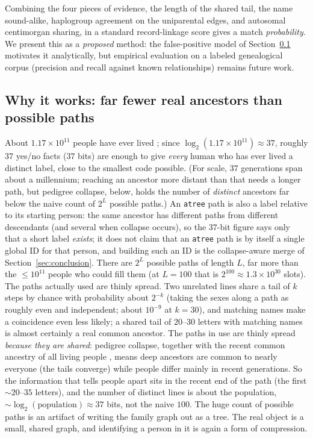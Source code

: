 \documentclass[11pt]{article}
\newcommand{\atree}{\texttt{atree}}
\begin{document}
Combining
the four pieces of evidence, the length of the shared tail, the name sound-alike, haplogroup
agreement on the uniparental edges, and autosomal centimorgan sharing, in a standard record-linkage
score \cite{fellegi1969} gives a match \emph{probability}. We present this as a
\emph{proposed} method: the false-positive model of Section~\ref{sec:why} motivates it analytically,
but empirical evaluation on a labeled genealogical corpus (precision and recall against known
relationships) remains future work.

\subsection{Why it works: far fewer real ancestors than possible paths}
\label{sec:why}
About $1.17\times10^{11}$ people have ever lived \cite{prb_everlived}; since
$\log_2(1.17\times10^{11})\approx 37$, roughly $37$ yes/no facts ($37$ bits) are enough to give
\emph{every} human who has ever lived a distinct label, close to the smallest code possible. (For
scale, $37$ generations span about a millennium; reaching an ancestor more distant than that needs a
longer path, but pedigree collapse, below, holds the number of \emph{distinct} ancestors far below
the naive count of $2^{L}$ possible paths.) An \atree{} path is also a label relative to its
starting person: the same ancestor has different paths from different descendants (and several when
collapse occurs), so the $37$-bit figure says only that a short label \emph{exists}; it does not
claim that an \atree{} path is by itself a single global ID for that person, and building such an ID
is the collapse-aware merge of Section~\ref{sec:conclusion}. There are $2^{L}$ possible paths of
length $L$, far more than the $\le 10^{11}$ people who could fill them (at $L{=}100$ that is
$2^{100}\approx 1.3\times10^{30}$ slots). The paths actually used are thinly spread. Two
unrelated lines share a tail of $k$ steps by chance with probability about $2^{-k}$ (taking the sexes
along a path as roughly even and independent; about $10^{-9}$ at $k{=}30$), and matching names make a
coincidence even less likely; a shared tail of $20$--$30$ letters with matching names is almost
certainly a real common ancestor. The paths in use are thinly spread \emph{because they are shared}:
pedigree collapse, together with the recent common ancestry of all living people
\cite{chang1999, rohde2004}, means deep ancestors are common to nearly everyone (the tails converge)
while people differ mainly in recent generations. So the information that tells people apart sits in
the recent end of the path (the first $\sim\!20$--$35$ letters), and the number of distinct
lines is about the population, $\sim\!\log_2(\text{population})\approx 37$ bits, not the naive $100$.
The huge count of possible paths is an artifact of writing the family graph out as a tree. The real
object is a small, shared graph, and identifying a person in it is again a form of compression.
\end{document}
